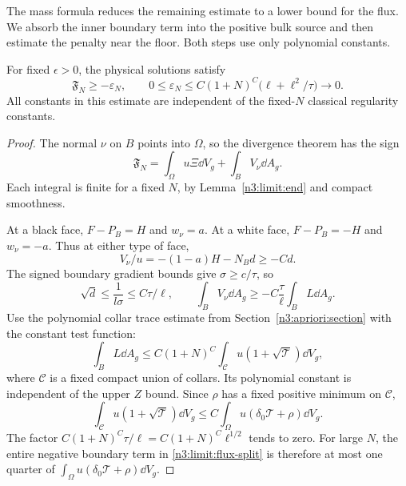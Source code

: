 The mass formula reduces the remaining estimate to a lower bound for
the flux. We absorb the inner boundary term into the positive bulk
source and then estimate the penalty near the floor. Both steps use
only polynomial constants.

\begin{lemma}\label{n3:limit:flux}
For fixed \(\epsilon>0\), the physical solutions satisfy
\[
 \mathfrak F_N\ge-\varepsilon_N,\qquad
 0\le\varepsilon_N\le
      C(1+N)^C\bigl(\ell+\ell^2/\tau\bigr)\longrightarrow0.
\]
All constants in this estimate are independent of the fixed-\(N\)
classical regularity constants.
\end{lemma}

\begin{proof}
The normal \(\nu\) on \(B\) points into \(\Omega\), so the divergence
theorem has the sign
\begin{equation}\label{n3:limit:flux-split}
 \mathfrak F_N
     =\int_\Omega u\Xi\dd V_g+\int_BV_\nu\dd A_g.
\end{equation}
Each integral is finite for a fixed \(N\), by
Lemma~\ref{n3:limit:end} and compact smoothness.

At a black face, \(F-P_B=H\) and \(w_\nu=a\).
At a white face, \(F-P_B=-H\) and \(w_\nu=-a\).
Thus at either type of face,
\[
                 V_\nu/u=-(1-a)H-N_Bd\ge-Cd.
\]
The signed boundary gradient bounds give
\(\sigma\ge c/\tau\), so
\[
 \sqrt d\le\frac1{l\sigma}\le C\tau/\ell,\qquad
 \int_BV_\nu\dd A_g\ge
             -C\frac{\tau}{\ell}\int_BL\dd A_g.
\]
Use the polynomial collar trace estimate from
Section~\ref{n3:apriori:section} with the constant test function:
\[
 \int_B L\dd A_g
    \le C(1+N)^C
       \int_{\mathcal C}u(1+\sqrt{\mathcal T})\dd V_g,
\]
where \(\mathcal C\) is a fixed compact union of collars.
Its polynomial constant is independent of the upper \(Z\) bound.
Since \(\rho\) has a fixed positive minimum on \(\mathcal C\),
\[
 \int_{\mathcal C}u(1+\sqrt{\mathcal T})\dd V_g
 \le C\int_\Omega u(\delta_0\mathcal T+\rho)\dd V_g.
\]
The factor \(C(1+N)^C\tau/\ell
=C(1+N)^C\ell^{1/2}\) tends to zero.
For large \(N\), the entire negative boundary term in
\eqref{n3:limit:flux-split} is therefore at most one quarter of
\(\int_\Omega u(\delta_0\mathcal T+\rho)\dd V_g\).


\end{proof}
